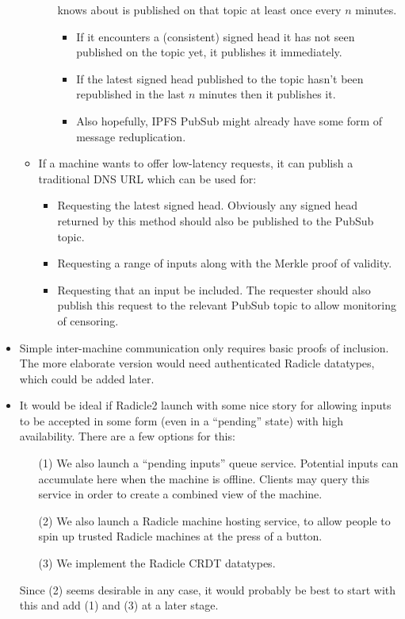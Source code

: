\documentclass[a4paper, oneside, 10pt]{amsart}
\begin{document}
\begin{itemize}
\begin{itemize}
\begin{itemize}
      knows about is published on that topic at least once every $n$ minutes.
      \begin{itemize}
      \item
        If it encounters a (consistent) signed head it has not seen published on
        the topic yet, it publishes it immediately.
      \item
        If the latest signed head published to the topic hasn't been republished
        in the last $n$ minutes then it publishes it.
      \item
        Also hopefully, IPFS PubSub might already have some form of message
        reduplication.
      \end{itemize}
    \end{itemize}
  \item
    If a machine wants to offer low-latency requests, it can publish a
    traditional DNS URL which can be used for:
    \begin{itemize}
    \item
      Requesting the latest signed head. Obviously any signed head returned by
      this method should also be published to the PubSub topic.
    \item
      Requesting a range of inputs along with the Merkle proof of validity.
    \item
      Requesting that an input be included. The requester should also publish
      this request to the relevant PubSub topic to allow monitoring of
      censoring.
    \end{itemize}
  \end{itemize}
\item
  Simple inter-machine communication only requires basic proofs of
  inclusion. The more elaborate version would need authenticated Radicle
  datatypes, which could be added later.
\item
  It would be ideal if Radicle2 launch with some nice story for allowing inputs
  to be accepted in some form (even in a ``pending'' state) with high
  availability. There are a few options for this:
  \begin{itemize}
  \item[(1)]
    We also launch a ``pending inputs'' queue service. Potential inputs can
    accumulate here when the machine is offline. Clients may query this service
    in order to create a combined view of the machine.
  \item[(2)]
    We also launch a Radicle machine hosting service, to allow people to spin up
    trusted Radicle machines at the press of a button.
  \item[(3)]
    We implement the Radicle CRDT datatypes.
  \end{itemize}
  Since (2) seems desirable in any case, it would probably be best to start with
  this and add (1) and (3) at a later stage.


\end{itemize}
\end{document}
